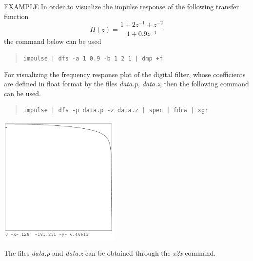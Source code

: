 \begin{qsection}{EXAMPLE}
In order to visualize the impulse response of the following transfer
 function
\begin{displaymath}
  H(z)=\frac{1+2z^{-1}+z^{-2}}{1+0.9z^{-1}}
\end{displaymath}
the command below can be used
\begin{quote}
 \verb!impulse | dfs -a 1 0.9 -b 1 2 1 | dmp +f!
\end{quote}
\par
For visualizing the frequency response plot of the digital filter,
whose coefficients are defined in float format by the files
{\em data.p, data.z}, then the following command can be used.
\begin{quote}
 \verb!impulse | dfs -p data.p -z data.z | spec | fdrw | xgr!
\end{quote}
\begin{center}
\includegraphics[width=6cm]{fig/dfs.pdf}
\end{center}
The files {\em data.p} and {\em data.z} can be obtained
through the {\em x2x} command.
\end{qsection}
